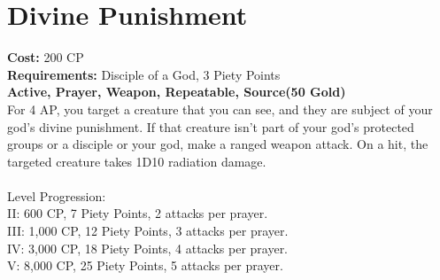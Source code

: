 \section{Divine Punishment}\label{prayer:divinePunishment}
\textbf{Cost:} 200 CP\\
\textbf{Requirements:} Disciple of a God, 3 Piety Points \\
\textbf{Active, Prayer, Weapon, Repeatable, Source(50 Gold)}\\
For 4 AP, you target a creature that you can see, and they are subject of your god's divine punishment.
If that creature isn't part of your god's protected groups or a disciple or your god, make a ranged weapon attack.
On a hit, the targeted creature takes 1D10 radiation damage.\\
\\
Level Progression:\\
II: 600 CP, 7 Piety Points, 2 attacks per prayer.\\
III: 1,000 CP, 12 Piety Points, 3 attacks per prayer.\\
IV: 3,000 CP, 18 Piety Points, 4 attacks per prayer.\\
V: 8,000 CP, 25 Piety Points, 5 attacks per prayer.\\
